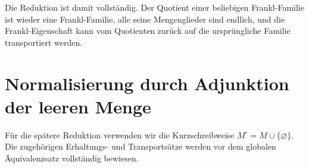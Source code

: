 \documentclass[main.tex]{subfiles}
\begin{document}
\begin{tabproof}
\end{tabproof}

Die Reduktion ist damit vollständig. Der Quotient einer beliebigen
Frankl-Familie ist wieder eine Frankl-Familie, alle seine Mengenglieder sind
endlich, und die Frankl-Eigenschaft kann vom Quotienten zurück auf die
ursprüngliche Familie transportiert werden.


\section{Normalisierung durch Adjunktion der leeren Menge}

Für die spätere Reduktion verwenden wir die Kurzschreibweise
\(M^\circ=M\cup\{\varnothing\}\). Die zugehörigen Erhaltungs- und
Transportsätze werden vor dem globalen Äquivalenzsatz vollständig bewiesen.
\end{document}
